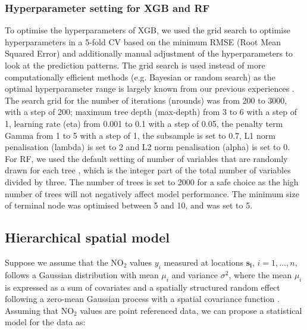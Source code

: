 \documentclass{article}
\begin{document}
\subsubsection{Hyperparameter setting for XGB and RF}
\label{sec:hp}

To optimise the hyperparameters of XGB, we used the grid search to optimise hyperparameters in a 5-fold CV based on the minimum RMSE (Root Mean Squared Error) and additionally manual adjustment of the hyperparameters to look at the prediction patterns. The grid search is used instead of more computationally efficient methods (e.g. Bayesian or random search) as the optimal hyperparameter range is largely known from our previous experiences \citep{luglobal,nijmegen}. The search grid for the number of iterations (nrounds) was from 200 to 3000, with a step of 200; maximum tree depth (max-depth) from 3 to 6 with a step of 1, learning rate (eta) from 0.001 to 0.1 with a step of 0.05, the penalty term Gamma \citep{xgboost} from 1 to 5 with a step of 1, the subsample is set to 0.7, L1 norm penalisation (lambda) is set to 2 and L2 norm penalisation (alpha) is set to 0. %
For RF, we used the default setting of number of variables that are randomly drawn for each tree \citep{breiman2001random}, which is the integer part of the total number of variables divided by three. The number of trees is set to 2000 for a safe choice as the high number of trees will not negatively affect model performance. The minimum size of terminal node was optimised between 5 and 10, and was set to 5.  




\subsection{Hierarchical spatial model}

Suppose we assume that the NO$_2$ values $y_i$ measured at locations $\boldsymbol{s_i}$, $i=1,\ldots,n$, follows a Gaussian distribution with mean $\mu_i$ and variance $\sigma^2$, where the mean $\mu_i$ is expressed as a sum of covariates and a spatially structured random effect following a zero-mean Gaussian process with a spatial covariance function \citep{moraga2019}. Assuming that NO$_2$ values are point referenced data, we can propose a statistical model for the data as:
\end{document}
